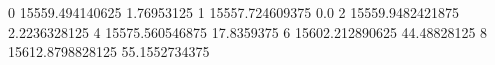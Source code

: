 0 15559.494140625 1.76953125
1 15557.724609375 0.0
2 15559.9482421875 2.2236328125
4 15575.560546875 17.8359375
6 15602.212890625 44.48828125
8 15612.8798828125 55.1552734375
